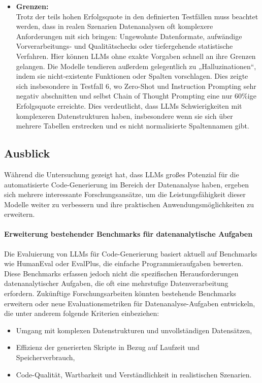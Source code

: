 \documentclass[11pt,a4paper]{article}
\begin{document}
\begin{itemize}
    \item \textbf{Grenzen:}\\Trotz der teils hohen Erfolgsquote in den definierten Testfällen muss beachtet werden, dass in realen Szenarien Datenanalysen oft komplexere Anforderungen mit sich bringen: Ungewohnte Datenformate, aufwändige Vorverarbeitungs- und Qualitätschecks oder tiefergehende statistische Verfahren. Hier können LLMs ohne exakte Vorgaben schnell an ihre Grenzen gelangen. Die Modelle tendieren außerdem gelegentlich zu „Halluzinationen“, indem sie nicht-existente Funktionen oder Spalten vorschlagen. Dies zeigte sich insbesondere in Testfall 6, wo Zero-Shot und Instruction Prompting sehr negativ abschnitten und selbst Chain of Thought Prompting eine nur 60\%ige Erfolgsquote erreichte. Dies verdeutlicht, dass LLMs Schwierigkeiten mit komplexeren Datenstrukturen haben, insbesondere wenn sie sich über mehrere Tabellen erstrecken und es nicht normalisierte Spaltennamen gibt.
\end{itemize}



\subsection{Ausblick}
\label{sec:ausblick}
Während die Untersuchung gezeigt hat, dass LLMs großes Potenzial für die automatisierte Code-Generierung im Bereich der Datenanalyse haben, ergeben sich mehrere interessante Forschungsansätze, um die Leistungsfähigkeit dieser Modelle weiter zu verbessern und ihre praktischen Anwendungsmöglichkeiten zu erweitern.
\paragraph{Erweiterung bestehender Benchmarks für datenanalytische Aufgaben}
Die Evaluierung von LLMs für Code-Generierung basiert aktuell auf Benchmarks wie HumanEval oder EvalPlus, die einfache Programmieraufgaben bewerten. Diese Benchmarks erfassen jedoch nicht die spezifischen Herausforderungen datenanalytischer Aufgaben, die oft eine mehrstufige Datenverarbeitung erfordern.
Zukünftige Forschungsarbeiten könnten bestehende Benchmarks erweitern oder neue Evaluationsmetriken für Datenanalyse-Aufgaben entwickeln, die unter anderem folgende Kriterien einbeziehen:
\begin{itemize}
    \item Umgang mit komplexen Datenstrukturen und unvollständigen Datensätzen,
    \item Effizienz der generierten Skripte in Bezug auf Laufzeit und Speicherverbrauch,
    \item Code-Qualität, Wartbarkeit und Verständlichkeit in realistischen Szenarien.
\end{itemize}
\end{document}
